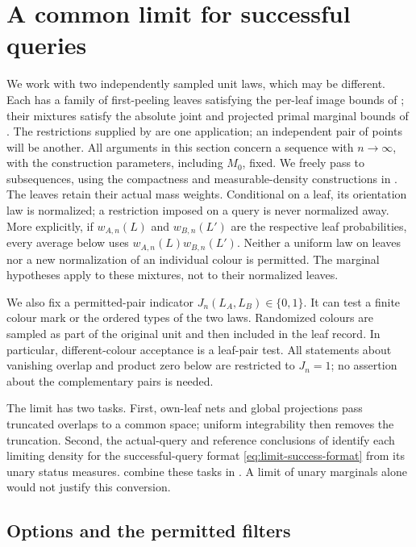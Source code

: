 \section{A common limit for successful queries}
\label{sec:common-limit}

We work with two independently sampled unit laws, which may be different.
Each has a family of first-peeling leaves satisfying the per-leaf image
bounds of ; their mixtures satisfy the absolute joint
and projected primal marginal bounds of .
The restrictions supplied by  are one
application; an independent pair of points will be another.
All arguments in this section concern a sequence with $n\to\infty$, with
the construction parameters, including $M_0$, fixed. We freely pass to
subsequences, using the compactness and measurable-density constructions
in . The leaves retain their actual mass weights. Conditional on
a leaf, its orientation law is normalized; a restriction imposed on a
query is never normalized away. More explicitly, if $w_{A,n}(L)$ and
$w_{B,n}(L')$ are the respective leaf probabilities, every average below
uses $w_{A,n}(L)w_{B,n}(L')$. Neither a uniform law on leaves nor a new
normalization of an individual colour is permitted. The marginal
hypotheses apply to these mixtures, not to their normalized leaves.

We also fix a permitted-pair indicator
$J_n(L_A,L_B)\in\{0,1\}$. It can test a finite colour mark or the
ordered types of the two laws. Randomized colours are sampled as part
of the original unit and then included in the leaf record. In
particular, different-colour acceptance is a leaf-pair test. All
statements about vanishing overlap and product zero below are restricted
to $J_n=1$; no assertion about the complementary pairs is needed.

The limit has two tasks. First, own-leaf nets and global projections
pass truncated overlaps to a common space; uniform integrability then
removes the truncation. Second, the actual-query and reference
conclusions of  identify each limiting density
for the successful-query format \eqref{eq:limit-success-format}
from its unary status measures.
 combine these tasks
in .
A limit of unary marginals alone would not justify this conversion.

\subsection{Options and the permitted filters}

